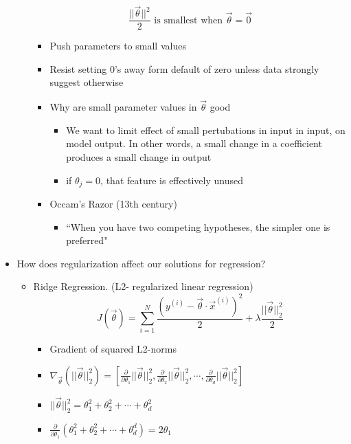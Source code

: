 \documentclass[10pt, oneside]{article}
\begin{document}
\begin{itemize}
\begin{itemize}
        $$\frac{||\vec \theta||^2}{2}\text{ is smallest when } \vec \theta = \vec 0$$
        \begin{itemize}
            \item Push parameters to small values
            \item Resist setting 0's away form default of zero unless data strongly suggest otherwise
            \item Why are small parameter values in $\vec \theta$ good
            \begin{itemize}
                \item We want to limit effect of small pertubations in input in input, on model output. In other words, a small change in a coefficient produces a small change in output
                \item if $\theta_j = 0$, that feature is effectively unused
            \end{itemize}
            \item Occam's Razor (13th century)
            \begin{itemize}
                \item ``When you have two competing hypotheses, the simpler one is preferred"
            \end{itemize}
        \end{itemize}
    \end{itemize}
    \item How does regularization affect our solutions for regression?
    \begin{itemize}
        \item Ridge Regression. (L2- regularized linear regression)\\
        $$J(\vec \theta) = \sum_{i=1}^N \frac{(y^{(i)} - \vec \theta \cdot \vec x ^{(i)})^2}{2} + \lambda \frac{||\vec \theta||_2 ^2}{2}$$
        \begin{itemize}
            \item Gradient of squared L2-norms
            \item $\nabla_{\vec \theta} (||\vec \theta||_2 ^2) = [\frac{\partial}{\partial \theta _1} ||\vec \theta ||_2 ^2 , \frac{\partial}{\partial \theta_2} ||\vec \theta||_2 ^2, \cdots,\frac{\partial}{\partial \theta_d} ||\vec \theta||_2 ^2]$
            \item $||\vec \theta||_2 ^2 = \theta_1 ^2 + \theta_2 ^2 + \cdots + \theta_d ^2$
            \item $\frac{\partial}{\partial \theta_1}(\theta_1 ^2 + \theta_2 ^2 + \cdots + \theta_d ^d) = 2\theta_1$

\end{itemize}
\end{itemize}
\end{itemize}
\end{document}
